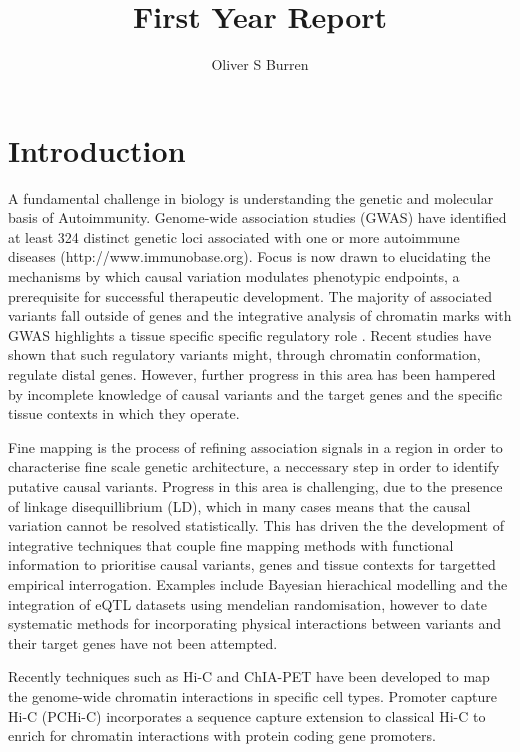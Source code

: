 \documentclass[a4paper,11pt]{book}
\author{Oliver S Burren}
\title{First Year Report}
\begin{document}
\maketitle
\tableofcontents
\chapter{Introduction}
A fundamental challenge in biology is understanding the genetic and molecular basis of Autoimmunity. Genome-wide association studies (GWAS) have identified at least 324 distinct genetic loci associated with one or more autoimmune diseases (http://www.immunobase.org). Focus is now drawn to elucidating the mechanisms by which causal variation modulates phenotypic endpoints, a prerequisite for successful therapeutic development. The majority of associated variants fall outside of genes \cite{MauranoHumbertRynesEtAl2012} and the integrative analysis of chromatin marks with GWAS highlights a tissue specific specific regulatory role \cite{FarhMarsonZhuEtAl2015}.  Recent studies \cite{SmemoTenaKimEtAl2014,Davison2012-zk} have shown that such regulatory variants might, through chromatin conformation, regulate distal genes. However, further progress in this area has been hampered by incomplete knowledge of causal variants and the target genes and the specific tissue contexts in which they operate\cite{Albert2015-jn}. 

Fine mapping is the process of refining association signals in a region in order to characterise fine scale genetic architecture, a neccessary step in order to identify putative causal variants. Progress in this area is challenging, due to the presence of linkage disequillibrium (LD), which in many cases means that the causal variation cannot be resolved statistically.  This has driven the the development of integrative techniques that couple fine mapping methods with functional information to prioritise causal variants, genes and tissue contexts for targetted empirical interrogation. Examples include Bayesian hierachical modelling \cite{Pickrell2014-xs} and the integration of eQTL datasets using mendelian randomisation\cite{ZhuZhangHuEtAl2016}, however to date systematic methods for incorporating physical interactions between variants and their target genes have not been attempted.  

Recently techniques such as Hi-C\cite{Lieberman-AidenvanBerkumWilliamsEtAl2009} and ChIA-PET\cite{FullwoodLiuPanEtAl2009} have been developed to map the genome-wide chromatin interactions in specific cell types\cite{RaoHuntleyDurandEtAl2014}. Promoter capture Hi-C (PCHi-C) incorporates a sequence capture extension to classical Hi-C to enrich for chromatin interactions with protein coding gene promoters. 
\end{document}

